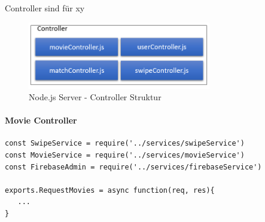 Controller sind für xy

\begin{figure}[h]
\centering
\includegraphics[width=8cm]{images/controllerStruktur.PNG}
\caption{Node.js Server - Controller Struktur}
\end{figure}

\paragraph{Movie Controller}

\begin{lstlisting}[caption=TODO, label=lst:TODO]
const SwipeService = require('../services/swipeService')
const MovieService = require('../services/movieService')
const FirebaseAdmin = require('../services/firebaseService')

exports.RequestMovies = async function(req, res){
   ...
}

\end{lstlisting}

